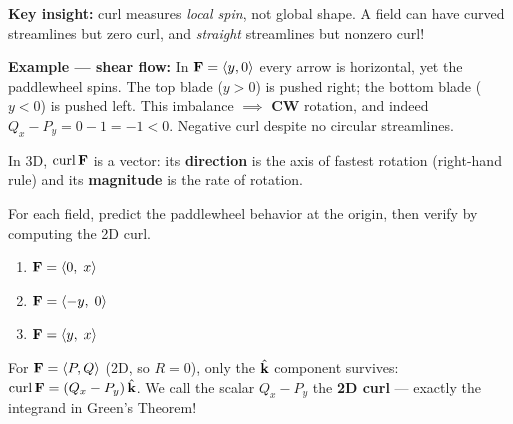 \documentclass[11pt]{article}
\begin{document}
\textbf{Key insight:} curl measures \textit{local spin}, not global shape. A field can have curved streamlines but zero curl, and \textit{straight} streamlines but nonzero curl!

\medskip
\textbf{Example --- shear flow:} In $\mathbf{F} = \left\langle y, 0 \right\rangle$ every arrow is horizontal, yet the paddlewheel spins. The top blade ($y>0$) is pushed right; the bottom blade ($y<0$) is pushed left. This imbalance $\implies$ \textbf{CW} rotation, and indeed $Q_x - P_y = 0 - 1 = -1 < 0$. Negative curl despite no circular streamlines.

\medskip
In 3D, $\operatorname{curl}\mathbf{F}$ is a vector: its \textbf{direction} is the axis of fastest rotation (right-hand rule) and its \textbf{magnitude} is the rate of rotation.

\begin{example}
For each field, predict the paddlewheel behavior at the origin, then verify by computing the 2D curl.

\begin{enumerate}[nosep]
\item[(a)] $\mathbf{F} = \left\langle 0,\; x \right\rangle$
\item[(b)] $\mathbf{F} = \left\langle -y,\; 0 \right\rangle$
\item[(c)] $\mathbf{F} = \left\langle y,\; x \right\rangle$
\end{enumerate}

\end{example}


For $\mathbf{F} = \left\langle P, Q \right\rangle$ (2D, so $R=0$), only the $\hat{\mathbf{k}}$ component survives:
$\operatorname{curl}\mathbf{F} = (Q_x - P_y)\,\hat{\mathbf{k}}$. We call the scalar $Q_x - P_y$ the \textbf{2D curl} --- exactly the integrand in Green's Theorem!
\end{document}
